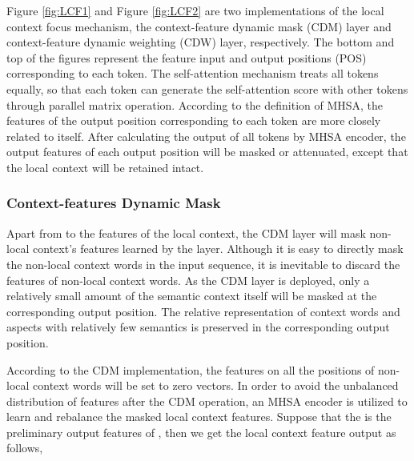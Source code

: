 \documentclass[a4paper,fleqn]{cas-sc}
\begin{document}
\begin{figure*}[pos=h]
	\centering
\caption{The simulation of the context-feature dynamic weighting (CDW) mechanism. The features of the output position (POS) that the dotted arrow points to will be weighted decay.}
	\label{fig:LCF2}
\end{figure*}

Figure \ref{fig:LCF1} and Figure \ref{fig:LCF2} are two implementations of the local context focus mechanism, the context-feature dynamic mask (CDM) layer and context-feature dynamic weighting (CDW) layer, respectively. The bottom and top of the figures represent the feature input and output positions (POS) corresponding to each token. The self-attention mechanism treats all tokens equally, so that each token can generate the self-attention score with other tokens through parallel matrix operation. According to the definition of MHSA, the features of the output position corresponding to each token are more closely related to itself. After calculating the output of all tokens by MHSA encoder, the output features of each output position will be masked or attenuated, except that the local context will be retained intact.

\subsubsection{Context-features Dynamic Mask}

Apart from to the features of the local context, the CDM layer will mask non-local context's features learned by the  layer. Although it is easy to directly mask the non-local context words in the input sequence, it is inevitable to discard the features of non-local context words. As the CDM layer is deployed, only a relatively small amount of the semantic context itself will be masked at the corresponding output position. The relative representation of context words and aspects with relatively few semantics is preserved in the corresponding output position.

According to the CDM implementation, the features on all the positions of non-local context words will be set to zero vectors. In order to avoid the unbalanced distribution of features after the CDM operation, an MHSA encoder is utilized to learn and rebalance the masked local context features. Suppose that the  is the preliminary output features of , then we get the local context feature output as follows,
\end{document}
